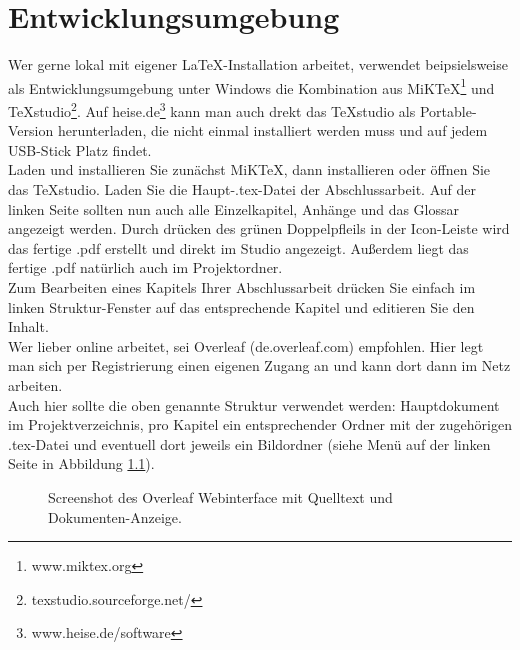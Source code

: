 %
%
%
\chapter{Entwicklungsumgebung}
\label{cha:umgebung}
%
%
Wer gerne lokal mit eigener LaTeX-Installation arbeitet, verwendet beipsielsweise als Entwicklungsumgebung unter Windows die Kombination aus MiKTeX\footnote{www.miktex.org} und TeXstudio\footnote{texstudio.sourceforge.net/}. Auf heise.de\footnote{www.heise.de/software} kann man auch drekt das TeXstudio als Portable-Version herunterladen, die nicht einmal installiert werden muss und auf jedem USB-Stick Platz findet.\\

Laden und installieren Sie zunächst MiKTeX, dann installieren oder öffnen Sie das TeXstudio. Laden Sie die Haupt-.tex-Datei der Abschlussarbeit. Auf der linken Seite sollten nun auch alle Einzelkapitel, Anhänge und das Glossar angezeigt werden. Durch drücken des grünen Doppelpfleils in der Icon-Leiste wird das fertige .pdf erstellt und direkt im Studio angezeigt. Außerdem liegt das fertige .pdf natürlich auch im Projektordner.\\

Zum Bearbeiten eines Kapitels Ihrer Abschlussarbeit drücken Sie einfach im linken Struktur-Fenster auf das entsprechende Kapitel und editieren Sie den Inhalt.\\ 

Wer lieber online arbeitet, sei Overleaf (de.overleaf.com) empfohlen. Hier legt man sich per Registrierung einen eigenen Zugang an und kann dort dann im Netz arbeiten.\\
Auch hier sollte die oben genannte Struktur verwendet werden: Hauptdokument im Projektverzeichnis, pro Kapitel ein entsprechender Ordner mit der zugehörigen .tex-Datei und eventuell dort jeweils ein Bildordner (siehe Menü auf der linken Seite in Abbildung \ref{fig:overleaf}). 
%
\begin{figure}
  \centering
   {}
  \caption[Overleaf]{Screenshot des Overleaf Webinterface mit Quelltext und Dokumenten-Anzeige.}
  \label{fig:overleaf}
\end{figure}
%
